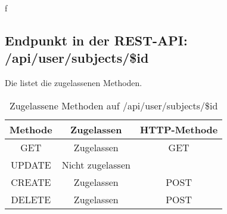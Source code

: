 f\subsection{Endpunkt in der REST-API: /api/user/subjects/\$id}
Die  listet die zugelassenen Methoden. 

\begin{table}[!htbp]
	\begin{tabular}{|c|c|c|}
		\hline
			\textbf{Methode} & \textbf{Zugelassen} & \textbf{HTTP-Methode} \\ \hline
			GET & Zugelassen & GET \\ \hline
			UPDATE & Nicht zugelassen & \\ \hline 
			CREATE & Zugelassen & POST \\ \hline 
			DELETE & Zugelassen & POST \\ \hline
	\end{tabular}

		\caption{Zugelassene Methoden auf /api/user/subjects/\$id}
		\label{tab:end:rest:api:user:subjects:id:meth}
\end{table}